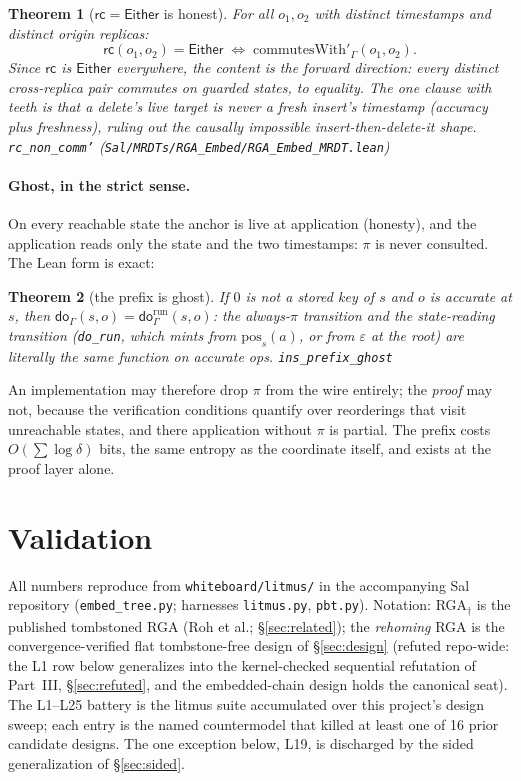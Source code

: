 \documentclass[11pt]{article}
\newtheorem{theorem}{Theorem}[section]
\newcommand{\rcrel}{\mathsf{rc}}                 %
\newcommand{\lean}[1]{\texttt{#1}}
\newcommand{\dodo}{\mathsf{do}}
\newcommand{\code}[1]{\texttt{#1}}
\newcommand{\Either}{\textsf{Either}}
\begin{document}
\begin{theorem}[$\rcrel = \Either$ is honest]
\label{thm:rceither}
For all $o_1, o_2$ with distinct timestamps and distinct origin
replicas:
\[
  \rcrel(o_1, o_2) = \Either
  \;\iff\;
  \mathrm{commutesWith}'_\Gamma(o_1, o_2) .
\]
Since $\rcrel$ is $\Either$ everywhere, the content is the forward
direction: every distinct cross-replica pair commutes on guarded
states, to equality. The one clause with teeth is that a delete's
live target is never a fresh insert's timestamp (accuracy plus
freshness), ruling out the causally impossible
insert-then-delete-it shape.
\hfill\lean{rc\_non\_comm'}
(\code{Sal/MRDTs/RGA\_Embed/RGA\_Embed\_MRDT.lean})
\end{theorem}

\paragraph{Ghost, in the strict sense.} On every reachable state the
anchor is live at application (honesty), and the application reads
only the state and the two timestamps: $\pi$ is never consulted.
The Lean form is exact:

\begin{theorem}[the prefix is ghost]
\label{thm:ghost}
If $0$ is not a stored key of $s$ and $o$ is accurate at $s$, then
$\dodo_\Gamma(s, o) = \dodo^{\mathrm{run}}_\Gamma(s, o)$: the
always-$\pi$ transition and the state-reading transition
(\lean{do\_run}, which mints from $\mathrm{pos}_s(a)$, or from
$\varepsilon$ at the root) are literally the same function on
accurate ops.
\hfill\lean{ins\_prefix\_ghost}
\end{theorem}

\noindent An implementation may therefore drop $\pi$ from the wire
entirely; the \emph{proof} may not, because the verification
conditions quantify over reorderings that visit unreachable states,
and there application without $\pi$ is partial. The prefix costs
$O(\sum \log \delta)$ bits, the same entropy as the coordinate
itself, and exists at the proof layer alone.

\section{Validation}
\label{sec:validation}

All numbers reproduce from \code{whiteboard/litmus/} in the
accompanying Sal repository
(\code{embed\_tree.py}; harnesses \code{litmus.py}, \code{pbt.py}).
Notation: RGA$_\dagger$ is the published tombstoned RGA (Roh et
al.; \S\ref{sec:related}); the \emph{rehoming} RGA is the
convergence-verified flat tombstone-free design of \S\ref{sec:design}
(refuted repo-wide: the L1 row below generalizes into the
kernel-checked sequential refutation of Part~III,
\S\ref{sec:refuted}, and the embedded-chain design holds the canonical
seat). The L1--L25
battery is the litmus suite accumulated over this project's
design sweep; each entry is the named countermodel that killed at
least one of 16 prior candidate designs. The one exception below,
L19, is discharged by the sided generalization of \S\ref{sec:sided}.
\end{document}
